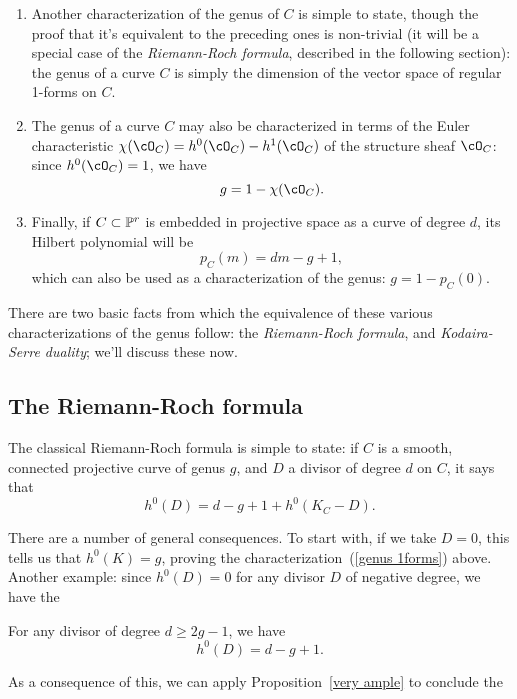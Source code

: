 \begin{enumerate}

\item\label{genus 1forms} Another characterization of the genus of $C$ is simple to state, though the proof that it's equivalent to the preceding ones is non-trivial (it will be a special case of the \emph{Riemann-Roch formula}, described in the following section): the genus of a curve $C$ is simply the dimension of the vector space of regular 1-forms on $C$.

\item The genus of a curve $C$ may also be characterized in terms of the Euler characteristic $\chi(\cO_C) = h^0(\cO_C) - h^1(\cO_C)$ of the structure sheaf $\cO_C$: since $h^0(\cO_C) = 1$, we have
$$
g = 1 - \chi(\cO_C).
$$

\item\label{genus Hilbert} Finally, if $C \subset \PP^r$ is embedded in projective space as a curve of degree $d$, its Hilbert polynomial will be
$$
p_C(m) = dm - g + 1,
$$
which can also be used as a characterization of the genus: $g = 1 - p_C(0)$.

\end{enumerate}

There are two basic facts from which the equivalence of these various characterizations of the genus follow: the \emph{Riemann-Roch formula}, and \emph{Kodaira-Serre duality}; we'll discuss these now.

\subsection{The Riemann-Roch formula}

The classical Riemann-Roch formula is simple to state: if $C$ is a smooth, connected projective curve of genus $g$, and $D$ a divisor of degree $d$ on $C$, it says that
$$
h^0(D) = d - g + 1 + h^0(K_C - D).
$$

There are a number of general consequences. To start with, if we take $D=0$, this tells us that $h^0(K) = g$, proving the characterization~(\ref{genus 1forms}) above. Another example: since $h^0(D) = 0$ for any divisor $D$ of negative degree, we have the

\begin{corollary}\label{nonspecial RR}
For any divisor of degree $d \geq 2g-1$, we have
$$
h^0(D) = d - g + 1.
$$
\end{corollary}

As a consequence of this, we can apply Proposition~\ref{very ample} to conclude the

